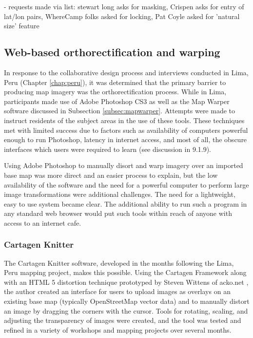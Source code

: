\documentclass[11pt]{report}
\begin{document}
 - requests made via list: stewart long asks for masking, Crispen asks for entry of lat/lon pairs, WhereCamp folks asked for locking, Pat Coyle asked for 'natural size' feature

\subsection{Web-based orthorectification and warping}

In response to the collaborative design process and interviews conducted in Lima, Peru (Chapter \ref{chap:peru}), it was determined that the primary barrier to producing map imagery was the orthorectification process. While in Lima, participants made use of Adobe Photoshop CS3 as well as the Map Warper software discussed in Subsection \ref{subsec:mapwarper}. Attempts were made to instruct residents of the subject areas in the use of these tools. These techniques met with limited success due to factors such as availability of computers powerful enough to run Photoshop, latency in internet access, and most of all, the obscure interfaces which users were required to learn (see discussion in 9.1.9).  

Using Adobe Photoshop to manually disort and warp imagery over an imported base map was more direct and an easier process to explain, but the low availability of the software and the need for a powerful computer to perform large image transformations were additional challenges. The need for a lightweight, easy to use system became clear. The additional ability to run such a program in any standard web browser would put such tools within reach of anyone with access to an internet cafe.

\subsubsection{Cartagen Knitter}
\label{subsubsec:knitter}

The Cartagen Knitter software, developed in the months following the Lima, Peru mapping project, makes this possible. Using the Cartagen Framework along with an HTML 5 distortion technique prototyped by Steven Wittens of acko.net \cite{wittens2008projective}, the author created an interface for users to upload images as overlays on an existing base map (typically OpenStreetMap vector data) and to manually distort an image by dragging the corners with the cursor. Tools for rotating, scaling, and adjusting the transparency of images were created, and the tool was tested and refined in a variety of workshops and mapping projects over several months. 
\end{document}
